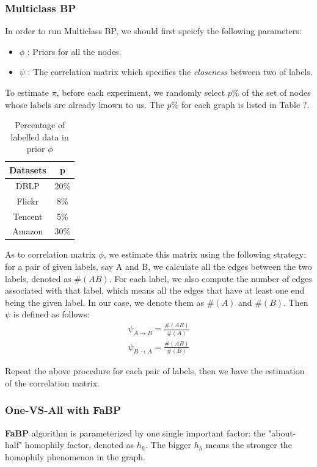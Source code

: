 \subsubsection*{Multiclass BP}
In order to run Multiclass BP, we should first speicfy the following parameters:
\begin{itemize}
	\item \textbf{$\phi$} : Priors for all the nodes.
	\item \textbf{$\psi$} : The correlation matrix which specifies the \textit{closeness} between two of labels. 
\end{itemize}

To estimate $\pi$, before each experiment, we randomly select $p\%$ of the set of nodes whose labels are already known to us. The $p\%$ for each graph is listed in Table ?.

\begin{table}[!ht]
\centering
\begin{tabular}{c|c}
\toprule
\textbf{Datasets} & \textbf{p}\\
\midrule
DBLP & 20\%\\
Flickr & 8\%\\
Tencent & 5\%\\
Amazon & 30\%\\
\bottomrule
\end{tabular}
\caption{Percentage of labelled data in prior $\phi$}
\end{table} 

As to correlation matrix $\phi$, we estimate this matrix using the following strategy: for a pair of given labels, say A and B, we calculate all the edges between the two labels, denoted as $\#(AB)$. For each label, we also compute the number of edges associated with that label, which means all the edges that have at least one end being the given label. In our case, we denote them as $\#(A)$ and $\#(B)$. Then $\psi$ is defined as follows:
\begin{gather*}
	\psi_{A\rightarrow B} = \frac{\#(AB)}{\#(A)}\\
	\psi_{B\rightarrow A} = \frac{\#(AB)}{\#(B)}
\end{gather*}

Repeat the above procedure for each pair of labels, then we have the estimation of the correlation matrix.

\subsubsection*{One-VS-All with \textbf{FaBP}}
\textbf{FaBP} algorithm is parameterized by one single important factor: the "about-half" homophily factor, denoted as $h_h$. The bigger $h_h$ means the stronger the homophily phenomenon in the graph.

